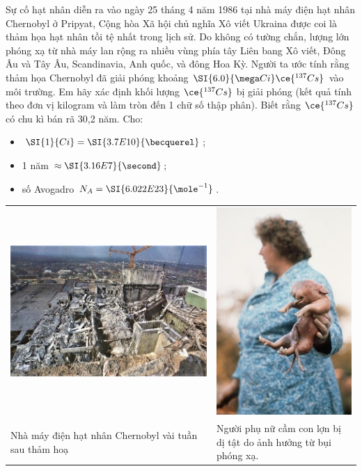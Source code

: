 \begin{ex}
	Sự cố hạt nhân diễn ra vào ngày 25 tháng 4 năm 1986 tại nhà máy điện hạt nhân Chernobyl ở Pripyat, Cộng hòa Xã hội chủ nghĩa Xô viết Ukraina được coi là thảm họa hạt nhân tồi tệ nhất trong lịch sử. Do không có tường chắn, lượng lớn phóng xạ từ nhà máy lan rộng ra nhiều vùng phía tây Liên bang Xô viết, Đông Âu và Tây Âu, Scandinavia, Anh quốc, và đông Hoa Kỳ. Người ta ước tính rằng thảm họa Chernobyl đã giải phóng khoảng $\SI{6.0}{\mega Ci} \ce{^{137}Cs}$ vào môi trường. Em hãy xác định khối lượng $\ce{^{137}Cs}$ bị giải phóng (kết quả tính theo đơn vị kilogram và làm tròn đến 1 chữ số thập phân). Biết rằng $\ce{^{137}Cs}$ có chu kì bán rã 30,2 năm. Cho:	
	\begin{itemize}
		\item $\SI{1}{Ci}=\SI{3.7E10}{\becquerel}$;
		\item 1 năm $\approx\SI{3.16E7}{\second}$;
		\item số Avogadro $N_A=\SI{6.022E23}{\mole^{-1}}$.
	\end{itemize}
	\begin{center}
		\begin{tabular}{C{6cm}C{6cm}}
			\includegraphics[width=0.8\linewidth]{figs/VN12-Y24-PH-SYL-032P-3}
			& \includegraphics[width=0.4\linewidth]{figs/VN12-Y24-PH-SYL-032P-4}\\
			Nhà máy điện hạt nhân Chernobyl vài tuần sau thảm hoạ & Người phụ nữ cầm con lợn bị dị tật do ảnh hưởng từ bụi phóng xạ.
		\end{tabular}
		

\end{center}
\end{ex}
